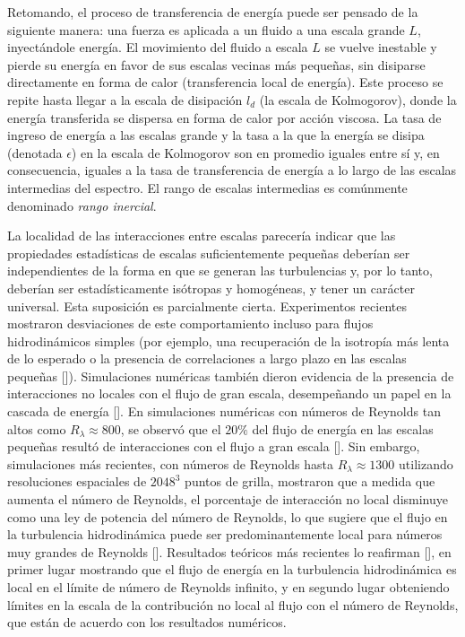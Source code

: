 Retomando, el proceso de transferencia de energía puede ser pensado de
la siguiente manera: una fuerza es aplicada a un fluido a una escala
grande $L$, inyectándole energía. El movimiento del fluido a escala
$L$ se vuelve inestable y pierde su energía en favor de sus escalas
vecinas más pequeñas, sin disiparse directamente en forma de calor
(transferencia local de energía). Este proceso se repite hasta llegar
a la escala de disipación $l_d$ (la escala de Kolmogorov), donde la
energía transferida se dispersa en forma de calor por acción
viscosa. La tasa de ingreso de energía a las escalas grande y la tasa
a la que la energía se disipa (denotada $\epsilon$) en la escala de
Kolmogorov son en promedio iguales entre sí y, en consecuencia,
iguales a la tasa de transferencia de energía a lo largo de las
escalas intermedias del espectro. El rango de escalas intermedias es
comúnmente denominado \textit{rango inercial}.

La localidad de las interacciones entre escalas parecería indicar que
las propiedades estadísticas de escalas suficientemente pequeñas
deberían ser independientes de la forma en que se generan las
turbulencias y, por lo tanto, deberían ser estadísticamente isótropas
y homogéneas, y tener un carácter universal. Esta suposición es
parcialmente cierta. Experimentos recientes mostraron desviaciones de
este comportamiento incluso para flujos hidrodinámicos simples (por
ejemplo, una recuperación de la isotropía más lenta de lo esperado o
la presencia de correlaciones a largo plazo en las escalas pequeñas
[\cite{carlier_experimental_2001, poulain_dynamics_2006,
shen_anisotropy_2000, wiltse_manipulation_1993,
wiltse_direct_1998}]). Simulaciones numéricas también dieron evidencia
de la presencia de interacciones no locales con el flujo de gran
escala, desempeñando un papel en la cascada de energía
[\cite{alexakis_imprint_2005, domaradzki_analysis_1988,
zhou_interacting_1993}]. En simulaciones numéricas con números de
Reynolds tan altos como $R_\lambda \approx 800$, se observó que el
$20\%$ del flujo de energía en las escalas pequeñas resultó de
interacciones con el flujo a gran escala
[\cite{mininni_large_2006}]. Sin embargo, simulaciones más recientes,
con números de Reynolds hasta $R_\lambda \approx 1300$ utilizando
resoluciones espaciales de $2048^3$ puntos de grilla, mostraron que a
medida que aumenta el número de Reynolds, el porcentaje de interacción
no local disminuye como una ley de potencia del número de Reynolds, lo
que sugiere que el flujo en la turbulencia hidrodinámica puede ser
predominantemente local para números muy grandes de Reynolds
[\cite{mininni_nonlocal_2008}]. Resultados teóricos más recientes lo
reafirman [\cite{aluie_scale_2010, eyink_localness_2009}], en primer
lugar mostrando que el flujo de energía en la turbulencia
hidrodinámica es local en el límite de número de Reynolds infinito, y
en segundo lugar obteniendo límites en la escala de la contribución no
local al flujo con el número de Reynolds, que están de acuerdo con los
resultados numéricos.

